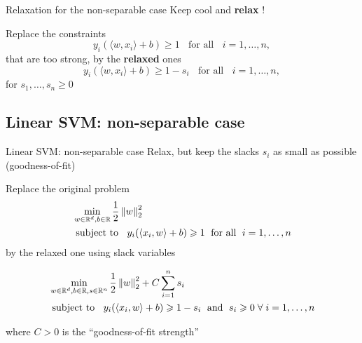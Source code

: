 \documentclass[xcolor={usenames,dvipsnames}]{beamer}
\begin{document}
 \begin{frame}{Relaxation for the non-separable case}
  Keep cool and \textbf{relax} !

  \bigskip
  Replace the constraints
  \begin{equation*}
    y_i (\langle {w, x_i} \rangle  + b) \geq 1 \;\; \text{ for all } \;\;
    i=1, \ldots, n,
  \end{equation*}
  \pause
  that are too strong, by the \textbf{relaxed} ones
  \begin{equation*}
    y_i (\langle {w, x_i} \rangle  + b) \geq 1 - s_i \;\; \text{ for all } \;\;
    i=1, \ldots, n,
  \end{equation*}
  for \textbf{} $s_1, \ldots, s_n \geq 0$
\end{frame}







\subsection{Linear SVM: non-separable case}

\begin{frame}{Linear SVM: non-separable case}
Relax, but keep the slacks $s_i$ as small as possible (goodness-of-fit)

Replace the original problem
\begin{align*}
  &\min_{w \in \mathbb{R}^d, b \in \mathbb{R}} \frac 12 \left\| w \right\|_2^2 \\
  &\text{ subject to } \;\;  y_i (\langle {x_i, w} \rangle  + b) \geqslant 1 \; \text{ for all } 
  \;i=1, \ldots, n
\end{align*}
by the relaxed one using slack variables
\begin{block}{}
\begin{align*}
  &\min_{w \in \mathbb{R}^d, b \in \mathbb{R}, s \in \mathbb{R}^n} \frac 12 \left\| w \right\|_2^2 
  + C \sum_{i=1}^n s_i \\
  &\text{ subject to } \;\;  y_i (\langle {x_i, w} \rangle  + b) \geqslant 1 - s_i \; 
  \text{ and } \; s_i \geqslant 0 \; \forall  \;i=1, \ldots, n
\end{align*}
\end{block}
where $C > 0$ is the ``goodness-of-fit strength''
\end{frame}
\end{document}
